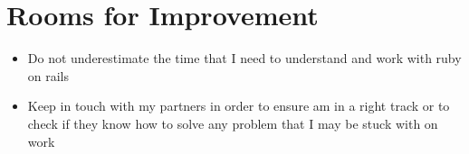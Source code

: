 \documentclass{article}
\begin{document}
\section*{Rooms for Improvement}

\begin{itemize}
   \item Do not underestimate the time that I need to understand and work with ruby on rails
   \item Keep in touch with my partners in order to ensure am in a right track or to check if they know how to solve any problem that I may be stuck with on work
\end{itemize}
\end{document}
